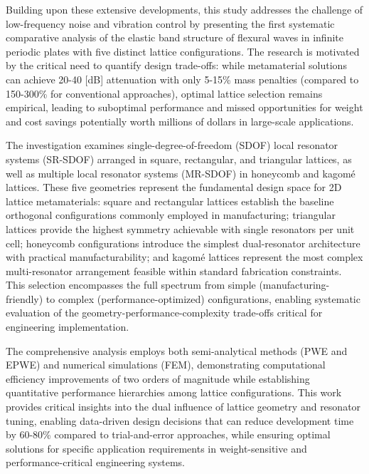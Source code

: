 \documentclass[review,numbers,sort&compress]{elsarticle}
\begin{document}

Building upon these extensive developments, this study addresses the challenge of low-frequency noise and vibration control by presenting the first systematic comparative analysis of the elastic band structure of flexural waves in infinite periodic plates with five distinct lattice configurations. The research is motivated by the critical need to quantify design trade-offs: while metamaterial solutions can achieve 20-40 [dB] attenuation with only 5-15\% mass penalties (compared to 150-300\% for conventional approaches), optimal lattice selection remains empirical, leading to suboptimal performance and missed opportunities for weight and cost savings potentially worth millions of dollars in large-scale applications.

The investigation examines single-degree-of-freedom (SDOF) local resonator systems (SR-SDOF) arranged in square, rectangular, and triangular lattices, as well as multiple local resonator systems (MR-SDOF) in honeycomb and kagom\'{e} lattices. These five geometries represent the fundamental design space for 2D lattice metamaterials: square and rectangular lattices establish the baseline orthogonal configurations commonly employed in manufacturing; triangular lattices provide the highest symmetry achievable with single resonators per unit cell; honeycomb configurations introduce the simplest dual-resonator architecture with practical manufacturability; and kagom\'{e} lattices represent the most complex multi-resonator arrangement feasible within standard fabrication constraints. This selection encompasses the full spectrum from simple (manufacturing-friendly) to complex (performance-optimized) configurations, enabling systematic evaluation of the geometry-performance-complexity trade-offs critical for engineering implementation.

The comprehensive analysis employs both semi-analytical methods (PWE and EPWE) and numerical simulations (FEM), demonstrating computational efficiency improvements of two orders of magnitude while establishing quantitative performance hierarchies among lattice configurations. This work provides critical insights into the dual influence of lattice geometry and resonator tuning, enabling data-driven design decisions that can reduce development time by 60-80\% compared to trial-and-error approaches, while ensuring optimal solutions for specific application requirements in weight-sensitive and performance-critical engineering systems.
\end{document}
